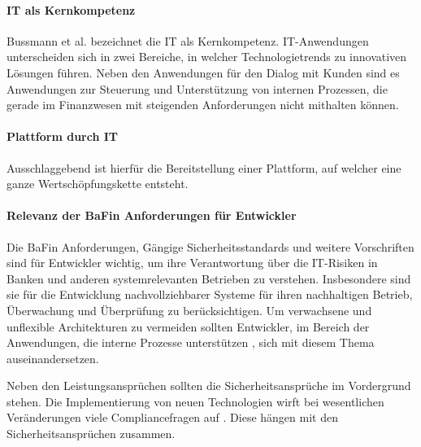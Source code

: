 \paragraph{IT als Kernkompetenz} Bussmann et al. bezeichnet die IT als Kernkompetenz. IT-Anwendungen unterscheiden sich in zwei Bereiche, in welcher Technologietrends zu innovativen Lösungen führen. Neben den Anwendungen für den Dialog mit Kunden sind es Anwendungen zur Steuerung und Unterstützung von internen Prozessen, die gerade im Finanzwesen mit steigenden Anforderungen nicht mithalten können. \cite{Bussmann2006}
\medskip
\\


\paragraph{Plattform durch IT}
Ausschlaggebend ist hierfür die Bereitstellung einer Plattform, auf welcher eine ganze Wertschöpfungskette entsteht.

\paragraph{Relevanz der BaFin Anforderungen für Entwickler}
Die BaFin Anforderungen, Gängige Sicherheitsstandards und weitere Vorschriften sind für Entwickler wichtig, um ihre Verantwortung über die IT-Risiken in Banken und anderen systemrelevanten Betrieben zu verstehen. Insbesondere sind sie für die Entwicklung nachvollziehbarer Systeme für ihren nachhaltigen Betrieb, Überwachung und Überprüfung zu berücksichtigen. Um verwachsene und unflexible Architekturen zu vermeiden sollten Entwickler, im Bereich der Anwendungen, die interne Prozesse unterstützen \cite{Bussmann2006}, sich mit diesem Thema auseinandersetzen.

Neben den Leistungsansprüchen sollten die Sicherheitsansprüche im Vordergrund stehen. Die Implementierung von neuen Technologien wirft bei wesentlichen Veränderungen viele Compliancefragen auf \cite{MaRisk:2017}. Diese hängen mit den Sicherheitsansprüchen zusammen. 

